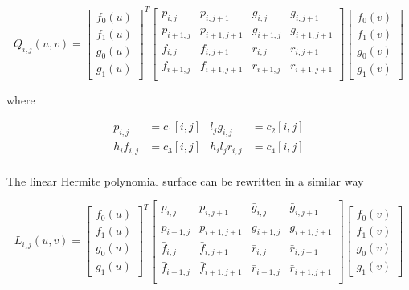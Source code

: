 \documentclass[a4paper, 11pt]{article}
\begin{document}
\begin{equation}
  Q_{i,j}(u,v) = \begin{bmatrix} f_0(u) \\ f_1(u) \\ g_0(u) \\ g_1(u) \end{bmatrix}^T
  \begin{bmatrix}
    p_{i,j} & p_{i, j+1} & g_{i,j} & g_{i, j+1} \\
    p_{i+1, j} & p_{i+1, j+1} & g_{i+1, j} & g_{i+1, j+1} \\
    f_{i,j} & f_{i, j+1} & r_{i,j} & r_{i, j+1} \\
    f_{i+1, j} & f_{i+1, j+1} & r_{i+1, j} & r_{i+1, j+1} \\
  \end{bmatrix}
  \begin{bmatrix} f_0(v) \\ f_1(v) \\  g_0(v) \\ g_1(v) \end{bmatrix}
\end{equation}

where

\begin{align*}
  p_{i,j} &= c_{1}[i,j] & l_j g_{i,j} &= c_{2}[i,j] \\
  h_i f_{i,j} &= c_{3}[i,j] & h_i l_j r_{i,j} &=  c_{4}[i,j] \\
\end{align*}


The linear Hermite polynomial surface can be rewritten in a similar way

\begin{equation}
  L_{i,j}(u,v) = \begin{bmatrix} f_0(u) \\ f_1(u) \\ g_0(u) \\ g_1(u) \end{bmatrix}^T
  \begin{bmatrix}
    p_{i,j} & p_{i, j+1} & \bar{g}_{i,j} & \bar{g}_{i, j+1} \\
    p_{i+1, j} & p_{i+1, j+1} & \bar{g}_{i+1, j} & \bar{g}_{i+1, j+1} \\
    \bar{f}_{i,j} & \bar{f}_{i, j+1} & \bar{r}_{i,j} & \bar{r}_{i, j+1} \\
    \bar{f}_{i+1, j} & \bar{f}_{i+1, j+1} & \bar{r}_{i+1, j} & \bar{r}_{i+1, j+1} \\
  \end{bmatrix}
  \begin{bmatrix} f_0(v) \\ f_1(v) \\  g_0(v) \\ g_1(v) \end{bmatrix}
\end{equation}
\end{document}

